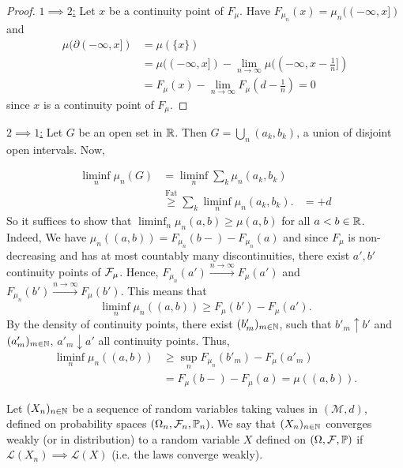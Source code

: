 \documentclass{article}
\begin{document}
\begin{proof}
	\underline{$ 1\implies 2$:}  Let $ x$ be a continuity point of $ F_{\mu}$. Have $ F_{\mu_{n}}(x) = \mu_{n}((-\infty, x])$ and 
	\[
	\begin{array}{ll}
		\mu(\partial(-\infty, x]) &= \mu(\{x\}) \\
					  &= \mu((-\infty, x])- \lim_{n \to \infty} \mu((-\infty, x-\frac{1}{n}])\\ 
					  & = F_{\mu}(x)- \lim_{n \to \infty} F_{\mu}(d-\frac{1}{n}) = 0
	\end{array}
	\]
	since $ x$ is a continuity point of $ F_{\mu}$. 
\end{proof}

\underline{$ 2\implies 1$:} Let $ G$ be an open set in $ \mathbb{R}$. Then $ G = \displaystyle\bigcup_{n} (a_{k}, b_{k})$, a union of disjoint open intervals. Now, 

\[
\begin{array}{ll}
    \displaystyle\liminf_{n}\mu_{n}(G) &= \displaystyle\liminf_{n}\displaystyle\sum_{k}\mu_{n}(a_{k}, b_{k})  \\
				       &\stackrel{\text{Fat}}{\geq}\displaystyle\sum_{k} \displaystyle\liminf_{n} \mu_{n}(a_{k}, b_{k}). 
     &= +d
\end{array}
\]
So it suffices to show that $ \displaystyle\liminf_{n} \mu_{n}(a,b)\geq \mu(a,b)$ for all $ a<b\in \mathbb{R}$.\\ 

Indeed, We have $ \mu_{n}((a,b)) = F_{\mu_{n}}(b-)-F_{\mu_{n}}(a)$ and since $ F_{\mu}$ is non-decreasing and has at most countably many discontinuities, there exist $ a', b'$ continuity points of $ \mathcal{F}_{\mu}$. Hence, $ F_{\mu_{n}}(a') \stackrel{n\to \infty}{\longrightarrow} F_{\mu}(a')$ and $ F_{\mu_{n}}(b') \stackrel{n\to \infty}{\longrightarrow} F_{\mu}(b')$. This means that
\[
    \displaystyle\liminf_{n}\mu_{n}((a,b)) \geq F_{\mu}(b')-F_{\mu}(a').
\]
By the density of continuity points, there exist $(b'_{m})_{m\in \mathbb{N}}$, such that $ b'_{m}\uparrow b'$ and $ (a'_{m})_{m\in \mathbb{N}}$, $ a'_{m} \downarrow a'$ all continuity points. Thus, 
\[
\begin{array}{ll}
	\displaystyle\liminf_{n} \mu_{n}((a,b)) &\geq \displaystyle\sup_{n}F_{\mu_{n}}(b'_{m})-F_{\mu}(a'_{m})\\
     &= F_{\mu}(b-)-F_{\mu}(a) = \mu((a,b)).
\end{array}
\]
\begin{boxdef}\label{def: weak conv law}
Let $ (X_{n})_{n\in \mathbb{N}}$ be a sequence of random variables taking values in $ ( \mathcal{M}, d)$, defined on probability spaces $ (\Omega_{n}, \mathcal{F}_{n}, \mathbb{P}_{n})$. We say that $ (X_{n})_{n\in \mathbb{N}}$ converges weakly (or in distribution) to a random  variable $ X$ defined on $ (\Omega, \mathcal{F}, \mathbb{P})$ if $  \mathcal{L}(X_{n})\implies \mathcal{L}(X)$ (i.e. the laws converge weakly). 
\end{boxdef}
\end{document}
